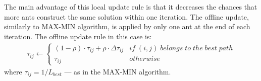 The main advantage of this local update rule is that it decreases the chances that more ants construct the same solution within one iteration.
The offline update, similarly to MAX-MIN algorithm, is applied by only one ant at the end of each iteration. The offline update rule in this case is:
\begin{align}
	\tau_{ij} \leftarrow \left\{
		\begin{array}{ll}
			(1-\rho)\cdot\tau_{ij}+\rho\cdot\Delta\tau_{ij} & if\; (i, j)\; belongs\; to\; the\; best\; path\\
			\tau_{ij} & otherwise
		\end{array}
	\right.
\end{align}
where $\tau_{ij} = 1/ L_{best}$ --- as in the MAX-MIN algorithm.







